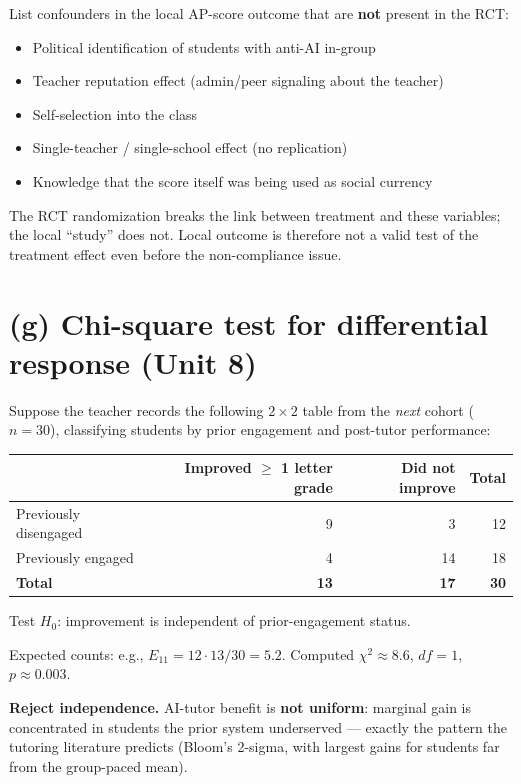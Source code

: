 \documentclass[11pt]{article}
\begin{document}
List confounders in the local AP-score outcome that are \textbf{not}
present in the RCT:
\begin{itemize}[leftmargin=*]
  \item Political identification of students with anti-AI in-group
  \item Teacher reputation effect (admin/peer signaling about the teacher)
  \item Self-selection into the class
  \item Single-teacher / single-school effect (no replication)
  \item Knowledge that the score itself was being used as social currency
\end{itemize}
The RCT randomization breaks the link between treatment and these
variables; the local ``study'' does not. Local outcome is therefore
not a valid test of the treatment effect even before the
non-compliance issue.

\section{(g) Chi-square test for differential response \textnormal{\small(Unit 8)}}

Suppose the teacher records the following $2 \times 2$ table from the
\emph{next} cohort ($n = 30$), classifying students by prior
engagement and post-tutor performance:

\begin{center}
\small
\begin{tabular}{lrrr}
\toprule
 & Improved $\geq$ 1 letter grade & Did not improve & Total \\
\midrule
Previously disengaged & 9 & 3  & 12 \\
Previously engaged    & 4 & 14 & 18 \\
\midrule
\textbf{Total}        & \textbf{13} & \textbf{17} & \textbf{30} \\
\bottomrule
\end{tabular}
\end{center}

Test $H_0$: improvement is independent of prior-engagement status.

Expected counts: e.g., $E_{11} = 12 \cdot 13 / 30 = 5.2$.
Computed $\chi^2 \approx 8.6$, $df = 1$, $p \approx 0.003$.

\textbf{Reject independence.} AI-tutor benefit is \textbf{not
uniform}: marginal gain is concentrated in students the prior system
underserved --- exactly the pattern the tutoring literature predicts
(Bloom's 2-sigma, with largest gains for students far from the
group-paced mean).
\end{document}
